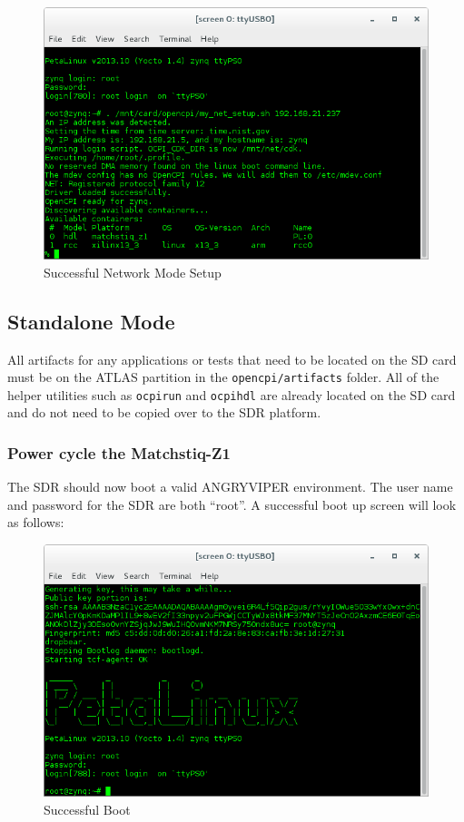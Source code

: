 \begin{figure}[H]
	\centerline{\includegraphics[scale=0.5]{Matchstiq_Z1_net_setup}}
	\caption{Successful Network Mode Setup}
	\label{fig:netsetup}
\end{figure}

\subsection{Standalone Mode}
All artifacts for any applications or tests that need to be located on the SD card must be on the ATLAS partition in the \texttt{opencpi/artifacts} folder.  All of the helper utilities such as \texttt{ocpirun} and \texttt{ocpihdl} are already located on the SD card and do not need to be copied over to the SDR platform.

\subsubsection*{Power cycle the Matchstiq-Z1}
The SDR should now boot a valid ANGRYVIPER environment.  The user name and password for the SDR are both ``root''.  A successful boot up screen will look as follows:

\begin{figure}[ht]
	\centerline{\includegraphics[scale=0.5]{Matchstiq_Z1_login}}
	\caption{Successful Boot}
	\label{fig:boot2}
\end{figure}

